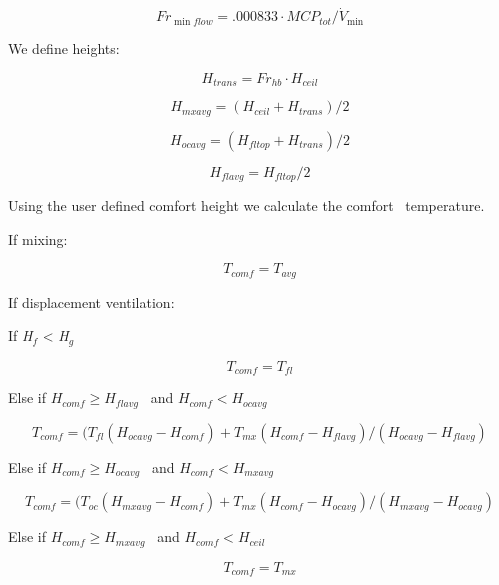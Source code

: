 \begin{equation}
F{r_{\min flow}} = .000833 \cdot MC{P_{tot}}/{\dot V_{\min }}
\end{equation}

We define heights:

\begin{equation}
{H_{trans}} = F{r_{hb}} \cdot {H_{ceil}}
\end{equation}

\begin{equation}
{H_{mxavg}} = ({H_{ceil}} + {H_{trans}})/2
\end{equation}

\begin{equation}
{H_{ocavg}} = ({H_{fltop}} + {H_{trans}})/2
\end{equation}

\begin{equation}
{H_{flavg}} = {H_{fltop}}/2
\end{equation}

Using the user defined comfort height we calculate the comfort~ temperature.

If mixing:

\begin{equation}
{T_{comf}} = {T_{avg}}
\end{equation}

If displacement ventilation:

If \emph{H\(_{f}\)} \textless{} \emph{H\(_{g}\)}

\begin{equation}
{T_{comf}} = {T_{fl}}
\end{equation}

Else if \({H_{comf}} \ge {H_{flavg}}\) ~and \({H_{comf}} < {H_{ocavg}}\)

\begin{equation}
{T_{comf}} = ({T_{fl}}({H_{ocavg}} - {H_{comf}}) + {T_{mx}}({H_{comf}} - {H_{flavg}})/({H_{ocavg}} - {H_{flavg}})
\end{equation}

Else if \({H_{comf}} \ge {H_{ocavg}}\) ~and \({H_{comf}} < {H_{mxavg}}\)

\begin{equation}
{T_{comf}} = ({T_{oc}}({H_{mxavg}} - {H_{comf}}) + {T_{mx}}({H_{comf}} - {H_{ocavg}})/({H_{mxavg}} - {H_{ocavg}})
\end{equation}

Else if \({H_{comf}} \ge {H_{mxavg}}\) ~and \({H_{comf}} < {H_{ceil}}\)

\begin{equation}
{T_{comf}} = {T_{mx}}
\end{equation}

